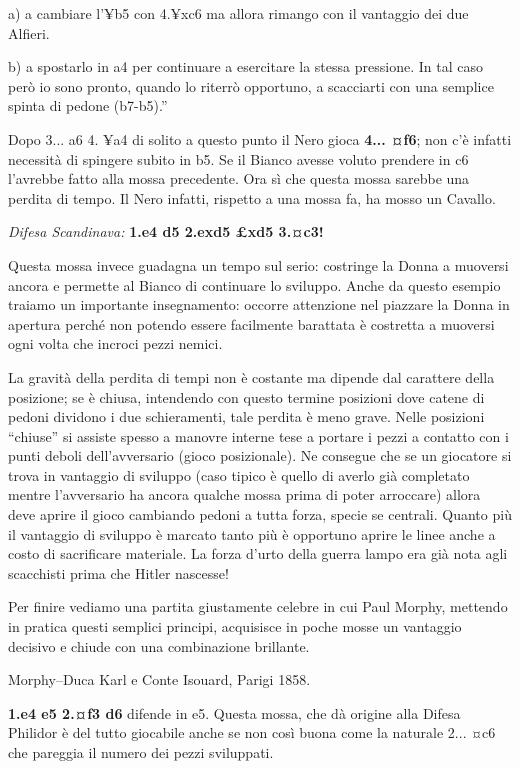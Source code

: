 a) a cambiare l'¥b5 con 4.¥xc6 ma allora rimango con il vantaggio dei
due Alfieri.

b) a spostarlo in a4 per continuare a esercitare la stessa pressione. In
tal caso però io sono pronto, quando lo riterrò opportuno, a scacciarti
con una semplice spinta di pedone (b7-b5).''

Dopo 3... a6 4. ¥a4 di solito a questo punto il Nero gioca \textbf{4...
¤f6}; non c'è infatti necessità di spingere subito in b5. Se il Bianco
avesse voluto prendere in c6 l'avrebbe fatto alla mossa precedente. Ora
sì che questa mossa sarebbe una perdita di tempo. Il Nero infatti,
rispetto a una mossa fa, ha mosso un Cavallo.

\emph{Difesa Scandinava:} \textbf{1.e4 d5 2.exd5 £xd5 3.¤c3!}


Questa mossa invece guadagna un tempo sul serio: costringe la Donna a
muoversi ancora e permette al Bianco di continuare lo sviluppo. Anche da
questo esempio traiamo un importante insegnamento: occorre attenzione
nel piazzare la Donna in apertura perché non potendo essere facilmente
barattata è costretta a muoversi ogni volta che incroci pezzi nemici.

La gravità della perdita di tempi non è costante ma dipende dal
carattere della posizione; se è chiusa, intendendo con questo termine
posizioni dove catene di pedoni dividono i due schieramenti, tale
perdita è meno grave. Nelle posizioni ``chiuse'' si assiste spesso a
manovre interne tese a portare i pezzi a contatto con i punti deboli
dell'avversario (gioco posizionale). Ne consegue che se un giocatore si
trova in vantaggio di sviluppo (caso tipico è quello di averlo già
completato mentre l'avversario ha ancora qualche mossa prima di poter
arroccare) allora deve aprire il gioco cambiando pedoni a tutta forza,
specie se centrali. Quanto più il vantaggio di sviluppo è marcato tanto
più è opportuno aprire le linee anche a costo di sacrificare materiale.
La forza d'urto della guerra lampo era già nota agli scacchisti prima
che Hitler nascesse!

Per finire vediamo una partita giustamente celebre in cui Paul Morphy,
mettendo in pratica questi semplici principi, acquisisce in poche mosse
un vantaggio decisivo e chiude con una combinazione brillante.

Morphy--Duca Karl e Conte Isouard, Parigi 1858.

\textbf{1.e4 e5 2.¤f3 d6} difende in e5. Questa mossa, che dà origine
alla Difesa Philidor è del tutto giocabile anche se non così buona come
la naturale 2... ¤c6 che pareggia il numero dei pezzi sviluppati.

